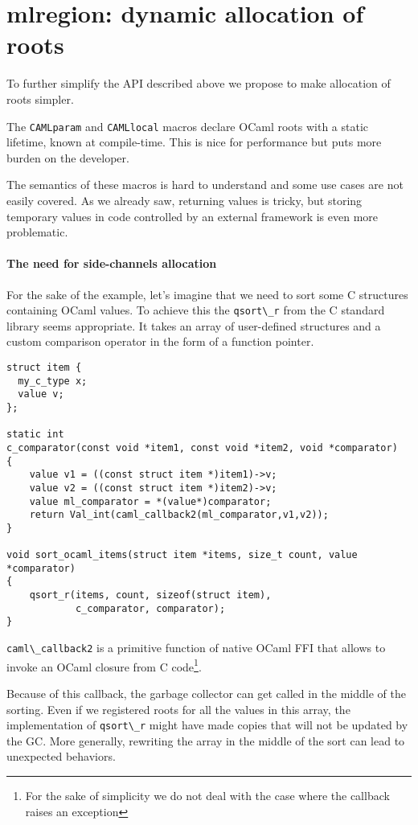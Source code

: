 \documentclass[a4paper]{easychair}
\newcommand{\cpp}[1]{\lstinline[style=C++]{#1}}
\begin{document}
\section{mlregion: dynamic allocation of roots}

To further simplify the API described above we propose to make
allocation of roots simpler.

The \cpp{CAMLparam} and \cpp{CAMLlocal} macros declare OCaml roots
with a static lifetime, known at compile-time. This is nice for
performance but puts more burden on the developer.

The semantics of these macros is hard to understand and some use cases
are not easily covered. As we already saw, returning values is tricky,
but storing temporary values in code controlled by an external framework
is even more problematic.

\paragraph{The need for side-channels allocation}

For the sake of the example, let's imagine that we need to sort some C
structures containing OCaml values. To achieve this the
\cpp{qsort\_r} from the C standard library seems appropriate. It
takes an array of user-defined structures and a custom comparison
operator in the form of a function pointer.
%
\begin{lstlisting}[style=C++]
struct item {
  my_c_type x;
  value v;
};

static int
c_comparator(const void *item1, const void *item2, void *comparator)
{
    value v1 = ((const struct item *)item1)->v;
    value v2 = ((const struct item *)item2)->v;
    value ml_comparator = *(value*)comparator;
    return Val_int(caml_callback2(ml_comparator,v1,v2));
}

void sort_ocaml_items(struct item *items, size_t count, value *comparator)
{
    qsort_r(items, count, sizeof(struct item),
            c_comparator, comparator);
}
\end{lstlisting}

\cpp{caml\_callback2} is a primitive function of native OCaml FFI
that allows to invoke an OCaml closure from C code\footnote{For the sake of
simplicity we do not deal with the case where the callback raises an
exception}.

Because of this callback, the garbage collector can get called in the
middle of the sorting. Even if we registered roots for all the values
in this array, the implementation of \cpp{qsort\_r} might have made
copies that will not be updated by the GC. More generally, rewriting
the array in the middle of the sort can lead to unexpected behaviors.
\end{document}
